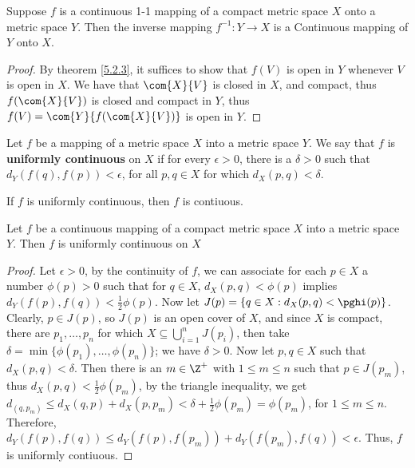 \begin{theorem}\label{5.3.4}
    Suppose $f$ is a continuous 1-1 mapping of a compact metric space  $X$ onto a metric 
    space  $Y$. Then the inverse mapping  $f^{-1}:Y \rightarrow X$ is a Continuous mapping 
    of  $Y$ onto  $X$.
\end{theorem}
\begin{proof}
    By theorem \ref{5.2.3}, it suffices to show that  $f(V)$ is open in  $Y$ whenever  $V$ is 
    open in  $X$. We have that  $\com{X}{V}$ is closed in  $X$, and compact, thus  $f(\com{X}{V})$ 
    is closed and compact in  $Y$, thus $ f(V)=\com{Y}{f(\com{X}{V})}$ is open in $Y$.
\end{proof}

\begin{definition}
    Let $f$ be a mapping of a metric space  $X$ into a metric space $Y$. We say that  $f$ is 
    \textbf{uniformly continuous} on $X$ if for every  $\epsilon>0$, there is a  $\delta>0$ such that 
    $d_Y(f(q),f(p))<\epsilon$, for all  $p,q \in X$ for which  $d_X(p,q)<\delta$.
\end{definition}

\begin{lemma}\label{5.3.5}
    If $f$ is uniformly continuous, then  $f$ is contiuous.
\end{lemma}

\begin{theorem}\label{5.3.6}
    Let $f$ be a continuous mapping of a compact metric space $X$ into a metric space $Y$. 
    Then  $f$ is uniformly continuous on  $X$
\end{theorem}
\begin{proof}
    Let $\epsilon>0$, by the continuity of  $f$, we can associate for each  $p \in X$ a number 
    $\phi(p)>0$ such that  for $q \in X$,  $d_X(p,q)<\phi(p)$ implies $d_Y(f(p),f(q))<\frac{1}{2}\phi(p)$. 
    Now let $J(p)=\{q \in X:d_X(p,q)<\pghi(p)\}$. Clearly,  $p \in J(p)$, so  $J(p)$ is 
    an open cover of  $X$, and since  $X$ is compact, there are  $p_1, \dots, p_n$ for which 
    $X \subseteq \bigcup_{i=1}^{n}{J(p_i)}$, then take  $\delta=\min\{\phi(p_1), \dots, \phi(p_n)\}$; we have 
    $\delta>0$. Now let  $p,q \in X$ such that  $d_X(p,q)<\delta$. Then  there is an $m \in \Z^+$ 
    with  $1 \leq m \leq n$ such that  $p \in J(p_m)$, thus  $d_X(p,q)<\frac{1}{2}\phi(p_m)$, 
    by the triangle inequality, we get $d_(q,p_m) \leq d_X(q,p)+d_X(p,p_m)<\delta+\frac{1}{2}\phi(p_m)=\phi(p_m)$, 
    for $1 \leq m \leq n$. Therefore,  $d_Y(f(p),f(q)) \leq d_Y(f(p),f(p_m))+d_Y(f(p_m),f(q))<\epsilon$. 
    Thus,  $f$ is uniformly contiuous.
\end{proof}


